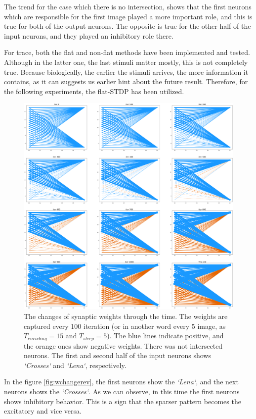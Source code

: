 \documentclass{article}
\begin{document}
	The trend for the case which there is no intersection, shows that the first neurons which are responsible for the first image played a more important role, and this is true for both of the output neurons. The opposite is true for the other half of the input neurons, and they played an inhibitory role there.
	
	For trace, both the flat and non-flat methods have been implemented and tested. Although in the latter one, the last stimuli matter mostly, this is not completely true. Because biologically, the earlier the stimuli arrives, the more information it contains, as it can suggests us earlier hint about the future result. Therefore, for the following experiments, the flat-STDP has been utilized.
	\begin{figure}
		\includegraphics[width=\textwidth]{weight_change.png}
		\caption{The changes of synaptic weights through the time. The weights are captured every 100 iteration (or in another word every 5 image, as $T_{encoding}=15$ and $T_{sleep}=5$). The blue lines indicate positive, and the orange ones show negative weights. There was not intersected neurons. The first and second half of the input neurons shows \textit{`Crosses`} and \textit{`Lena`}, respectively.}
		\label{fig:wchange}
	\end{figure}
	
	In the figure \ref{fig:wchangerev}, the first neurons show the \textit{`Lena`}, and the next neurons shows the \textit{`Crosses`}. As we can observe, in this time the first neurons shows inhibitory behavior. This is a sign that the sparser pattern becomes the excitatory and vice versa.
\end{document}
